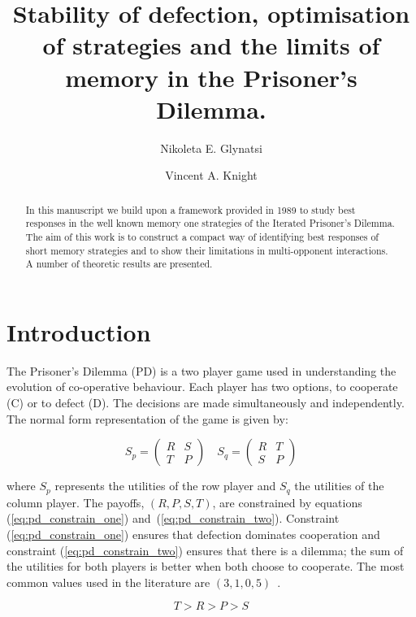 \documentclass[10pt]{article}
\title{Stability of defection, optimisation of strategies and the limits of
       memory in the Prisoner's Dilemma.}
\author{Nikoleta E. Glynatsi \and Vincent A. Knight}
\date{}
\begin{document}
\maketitle

\begin{abstract}
    In this manuscript we build upon a framework provided in 1989 to study best
    responses in the well known memory one strategies of the Iterated Prisoner's
    Dilemma. The aim of this work is to construct a compact way of identifying
    best responses of short memory strategies and to show their limitations in
    multi-opponent interactions. A number of theoretic results are presented.
\end{abstract}

\section{Introduction}\label{section:introduction}

The Prisoner's Dilemma (PD) is a two player game used in understanding the
evolution of co-operative behaviour. Each player has two options, to cooperate
(C) or to defect (D). The decisions are made simultaneously and independently.
The normal form representation of the game is given by:

\begin{equation}\label{equ:pd_definition}
    S_p =
    \begin{pmatrix}
        R & S  \\
        T & P
    \end{pmatrix}
    \quad
    S_q =
    \begin{pmatrix}
        R & T  \\
        S & P
    \end{pmatrix}
\end{equation}

where \(S_p\) represents the utilities of the row player and \(S_q\) the
utilities of the column player. The payoffs, \((R, P, S, T)\), are constrained
by equations (\ref{eq:pd_constrain_one}) and~(\ref{eq:pd_constrain_two}).
Constraint (\ref{eq:pd_constrain_one}) ensures that
defection dominates cooperation and constraint (\ref{eq:pd_constrain_two})
ensures that there is a dilemma; the sum of the utilities for both players is
better when both choose to cooperate. The
most common values used in the literature are
\((3, 1, 0, 5)\)~\cite{Axelrod1981}.

\begin{equation}\label{eq:pd_constrain_one}
    T > R > P > S
\end{equation}
\end{document}
